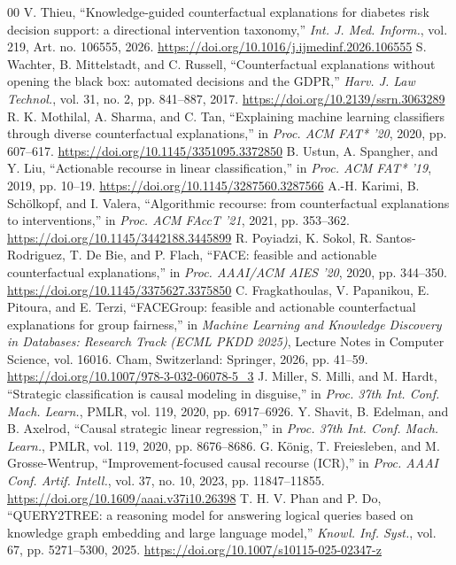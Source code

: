 \documentclass[conference]{IEEEtran}
\begin{document}
\begin{thebibliography}{00}
 V. Thieu, ``Knowledge-guided counterfactual explanations for diabetes risk decision support: a directional intervention taxonomy,'' \emph{Int. J. Med. Inform.}, vol. 219, Art. no. 106555, 2026. \url{https://doi.org/10.1016/j.ijmedinf.2026.106555}
 S. Wachter, B. Mittelstadt, and C. Russell, ``Counterfactual explanations without opening the black box: automated decisions and the GDPR,'' \emph{Harv. J. Law Technol.}, vol. 31, no. 2, pp. 841--887, 2017. \url{https://doi.org/10.2139/ssrn.3063289}
 R. K. Mothilal, A. Sharma, and C. Tan, ``Explaining machine learning classifiers through diverse counterfactual explanations,'' in \emph{Proc. ACM FAT* '20}, 2020, pp. 607--617. \url{https://doi.org/10.1145/3351095.3372850}
 B. Ustun, A. Spangher, and Y. Liu, ``Actionable recourse in linear classification,'' in \emph{Proc. ACM FAT* '19}, 2019, pp. 10--19. \url{https://doi.org/10.1145/3287560.3287566}
 A.-H. Karimi, B. Sch\"olkopf, and I. Valera, ``Algorithmic recourse: from counterfactual explanations to interventions,'' in \emph{Proc. ACM FAccT '21}, 2021, pp. 353--362. \url{https://doi.org/10.1145/3442188.3445899}
 R. Poyiadzi, K. Sokol, R. Santos-Rodriguez, T. De Bie, and P. Flach, ``FACE: feasible and actionable counterfactual explanations,'' in \emph{Proc. AAAI/ACM AIES '20}, 2020, pp. 344--350. \url{https://doi.org/10.1145/3375627.3375850}
 C. Fragkathoulas, V. Papanikou, E. Pitoura, and E. Terzi, ``FACEGroup: feasible and actionable counterfactual explanations for group fairness,'' in \emph{Machine Learning and Knowledge Discovery in Databases: Research Track (ECML PKDD 2025)}, Lecture Notes in Computer Science, vol. 16016. Cham, Switzerland: Springer, 2026, pp. 41--59. \url{https://doi.org/10.1007/978-3-032-06078-5_3}
 J. Miller, S. Milli, and M. Hardt, ``Strategic classification is causal modeling in disguise,'' in \emph{Proc. 37th Int. Conf. Mach. Learn.}, PMLR, vol. 119, 2020, pp. 6917--6926.
 Y. Shavit, B. Edelman, and B. Axelrod, ``Causal strategic linear regression,'' in \emph{Proc. 37th Int. Conf. Mach. Learn.}, PMLR, vol. 119, 2020, pp. 8676--8686.
 G. K\"onig, T. Freiesleben, and M. Grosse-Wentrup, ``Improvement-focused causal recourse (ICR),'' in \emph{Proc. AAAI Conf. Artif. Intell.}, vol. 37, no. 10, 2023, pp. 11847--11855. \url{https://doi.org/10.1609/aaai.v37i10.26398}
 T. H. V. Phan and P. Do, ``QUERY2TREE: a reasoning model for answering logical queries based on knowledge graph embedding and large language model,'' \emph{Knowl. Inf. Syst.}, vol. 67, pp. 5271--5300, 2025. \url{https://doi.org/10.1007/s10115-025-02347-z}

\end{thebibliography}
\end{document}
